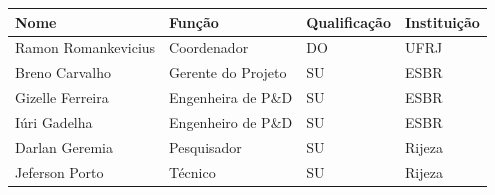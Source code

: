 \cleardoublepage

\begin{onecolumn}
\thispagestyle{empty}


\begin{center}

  
 \vfill



  
  \vspace{0.50cm}



  \begin{center}
    \begin{tabular}{| l | l | l | l |}
    
    \hline
   	 Nome 					& Função			 & Qualificação 	& Instituição	 \\\hline
   	 Ramon Romankevicius 	& Coordenador 	 	 & DO			    & UFRJ  	\\\hline		
	 Breno Carvalho			& Gerente do Projeto & SU 			    & ESBR 		\\\hline
	 Gizelle Ferreira 		& Engenheira de P\&D & SU 				& ESBR 		\\\hline
	 Iúri Gadelha	 		& Engenheiro de P\&D & SU 				& ESBR 		\\\hline
	 Darlan Geremia 		& Pesquisador		 & SU 				& Rijeza 	\\\hline
	 Jeferson Porto  		& Técnico			 & SU 				& Rijeza 	\\\hline
	  
\hline

    
    \hline 
    \end{tabular}
\end{center}

\end{center}
\end{onecolumn}

\newpage

\hypersetup{pageanchor=true}

